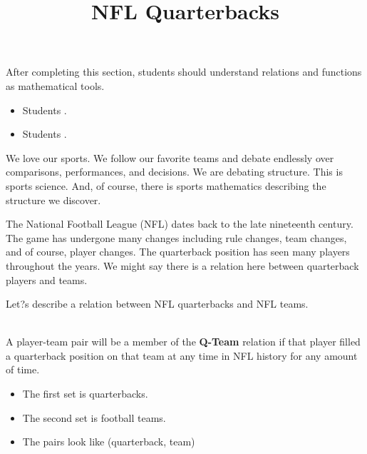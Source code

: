 \documentclass{ximera}
\title{NFL Quarterbacks}
\begin{document}
\begin{abstract}
\end{abstract}

\maketitle

\begin{sectionOutcomes}

After completing this section, students should understand relations and functions as mathematical tools. 

\begin{itemize}
\item Students .
\item Students .
\end{itemize}

\end{sectionOutcomes}





We love our sports. We follow our favorite teams and debate endlessly over comparisons, performances, and decisions. We are debating structure.  This is sports science. And, of course, there is sports mathematics describing the structure we discover.

The National Football League (NFL) dates back to the late nineteenth century.  The game has undergone many changes including rule changes, team changes, and of course, player changes. The quarterback position has seen many players throughout the years. We might say there is a relation here between quarterback players and teams.

Let?s describe a relation between NFL quarterbacks and NFL teams.  



\begin{definition}
\quad \\
A player-team pair will be a member of the \textbf{Q-Team} relation if that player filled a quarterback position on that team at any time in NFL history for any amount of time.  

\begin{itemize}
\item The first set is quarterbacks.
\item The second set is football teams.
\item The pairs look like (quarterback, team)
\end{itemize}

\end{definition}
\end{document}
